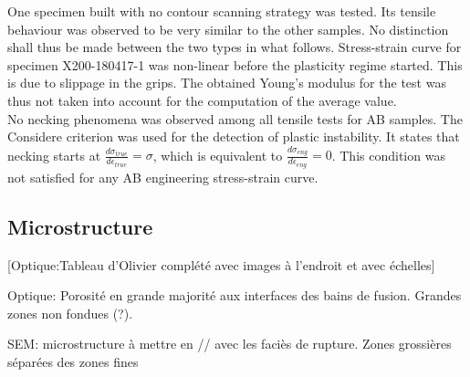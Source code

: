  \begin{center}
\begin{table}[ht]
\noindent{}

\caption[Average tensile mechanical properties of the as-built specimens from batch X200-180417]{Average tensile mechanical properties of the as-built specimens from batch X200-180417}
\label{tab:tracMAB}
\end{table}
 \end{center}
 
One specimen built with no contour scanning strategy was tested. Its tensile behaviour was observed to be very similar to the other samples. No distinction shall thus be made between the two types in what follows. Stress-strain curve for specimen X200-180417-1 was non-linear before the plasticity regime started. This is due to slippage in the grips. The obtained Young's modulus for the test was thus not taken into account for the computation of the average value.\\

No necking phenomena was observed among all tensile tests for AB samples. The Considere criterion was used for the detection of plastic instability. It states that necking starts at $\frac{d\sigma_{true}}{d\epsilon_{true}}=\sigma$, which is equivalent to $\frac{d\sigma_{eng}}{d\epsilon_{eng}}=0$. This condition was not satisfied for any AB engineering stress-strain curve.\\

\subsection{Microstructure}

[Optique:Tableau d'Olivier complété avec images à l'endroit et avec échelles] 

Optique: Porosité en grande majorité aux interfaces des bains de fusion. Grandes zones non fondues (?).

SEM: microstructure à mettre en // avec les faciès de rupture. Zones grossières séparées des zones fines


